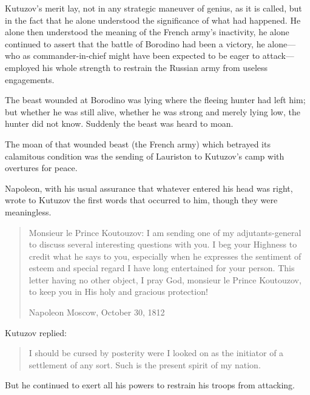 Kutuzov's merit lay, not in any strategic maneuver of genius, as
it is called, but in the fact that he alone understood the
significance of what had happened. He alone then understood the
meaning of the French army's inactivity, he alone continued to
assert that the battle of Borodino had been a victory, he
alone---who as commander-in-chief might have been expected to be
eager to attack---employed his whole strength to restrain the
Russian army from useless engagements.

The beast wounded at Borodino was lying where the fleeing hunter
had left him; but whether he was still alive, whether he was
strong and merely lying low, the hunter did not know. Suddenly
the beast was heard to moan.

The moan of that wounded beast (the French army) which betrayed
its calamitous condition was the sending of Lauriston to
Kutuzov's camp with overtures for peace.

Napoleon, with his usual assurance that whatever entered his head
was right, wrote to Kutuzov the first words that occurred to him,
though they were meaningless.

\begin{quote}\calli Monsieur le Prince Koutouzov: I am sending
one of my adjutants-general to discuss several interesting
questions with you. I beg your Highness to credit what he says to
you, especially when he expresses the sentiment of esteem and
special regard I have long entertained for your person. This
letter having no other object, I pray God, monsieur le Prince
Koutouzov, to keep you in His holy and gracious protection!

  Napoleon Moscow, October 30, 1812 \end{quote}

Kutuzov replied: \begin{quote}\calli I should be cursed by
posterity were I looked on as the initiator of a settlement of
any sort. Such is the present spirit of my nation.  \end{quote}

But he continued to exert all his powers to restrain his troops
from attacking.

